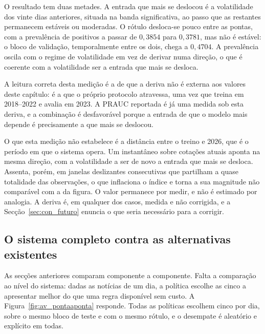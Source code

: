O resultado tem duas metades. A entrada que mais se deslocou é a volatilidade dos vinte dias
anteriores, situada na banda significativa, ao passo que as restantes permanecem estáveis ou
moderadas. O rótulo desloca-se pouco entre as pontas, com a prevalência de positivos a passar de
$0{,}3854$ para $0{,}3781$, mas não é estável: o bloco de validação, temporalmente entre os dois,
chega a $0{,}4704$. A prevalência oscila com o regime de volatilidade em vez de derivar numa
direção, o que é coerente com a volatilidade ser a entrada que mais se desloca.

A leitura correta desta medição é a de que a deriva não é externa aos valores deste capítulo: é a
que o próprio protocolo atravessa, uma vez que treina em 2018--2022 e avalia em 2023. A \gls{PRAUC}
reportada é já uma medida sob esta deriva, e a combinação é desfavorável porque a entrada de que o
modelo mais depende é precisamente a que mais se deslocou.

O que esta medição não estabelece é a distância entre o treino e 2026, que é o período em que o
sistema opera. Um instantâneo sobre cotações atuais aponta na mesma direção, com a volatilidade a ser de novo a
entrada que mais se desloca. Assenta, porém, em janelas deslizantes consecutivas que partilham a
quase totalidade das observações, o que inflaciona o índice e torna a sua magnitude não comparável
com a da figura. O valor permanece por medir, e não é estimado por analogia. A
deriva é, em qualquer dos casos, medida e não corrigida, e a Secção~\ref{sec:con_futuro} enuncia o
que seria necessário para a corrigir.

\subsection{O sistema completo contra as alternativas existentes}

As secções anteriores comparam componente a componente. Falta a comparação ao nível do sistema:
dadas as notícias de um dia, a política escolhe as cinco a apresentar melhor do que uma regra
disponível sem custo. A Figura~\ref{fig:av_pontaaponta} responde. Todas as políticas escolhem cinco
por dia, sobre o mesmo bloco de teste e com o mesmo rótulo, e o desempate é aleatório e explícito em
todas.

